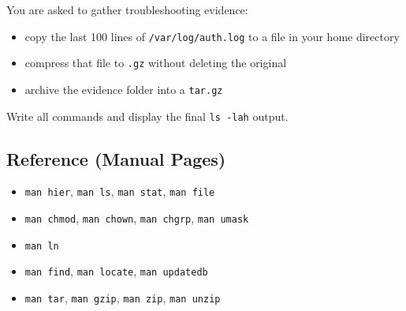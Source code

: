 \begin{exercisebox}
You are asked to gather troubleshooting evidence:
\begin{itemize}
\item copy the last 100 lines of \texttt{/var/log/auth.log} to a file in your home directory
\item compress that file to \texttt{.gz} without deleting the original
\item archive the evidence folder into a \texttt{tar.gz}
\end{itemize}
Write all commands and display the final \texttt{ls -lah} output.
\end{exercisebox}

\subsection*{Reference (Manual Pages)}
\begin{itemize}
    \item \texttt{man hier}, \texttt{man ls}, \texttt{man stat}, \texttt{man file}
    \item \texttt{man chmod}, \texttt{man chown}, \texttt{man chgrp}, \texttt{man umask}
    \item \texttt{man ln}
    \item \texttt{man find}, \texttt{man locate}, \texttt{man updatedb}
    \item \texttt{man tar}, \texttt{man gzip}, \texttt{man zip}, \texttt{man unzip}
\end{itemize}
